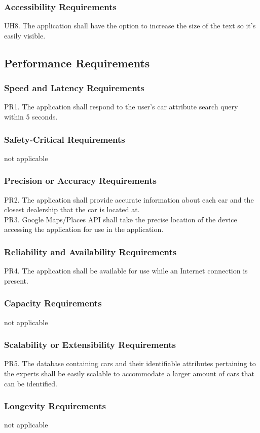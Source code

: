 \documentclass[12pt]{article}
\begin{document}
\subsubsection{Accessibility Requirements}
UH8. The application shall have the option to increase the size of the text so it's easily visible.
\subsection{Performance Requirements}
\subsubsection{Speed and Latency Requirements}
PR1. The application shall respond to the user’s car attribute search query within 5 seconds.
\subsubsection{Safety-Critical Requirements}
not applicable
\subsubsection{Precision or Accuracy Requirements}
PR2. The application shall provide accurate information about each car and the closest dealership that the car is located at.\\
PR3. Google Maps/Places API shall take the precise location of the device accessing the application for use in the application.
\subsubsection{Reliability and Availability Requirements}
PR4. The application shall be available for use while an Internet connection is present.
\subsubsection{Capacity Requirements}
not applicable
\subsubsection{Scalability or Extensibility Requirements}
PR5. The database containing cars and their identifiable attributes pertaining to the experts shall be easily scalable to accommodate a larger amount of cars that can be identified.
\subsubsection{Longevity Requirements}
not applicable
\end{document}
